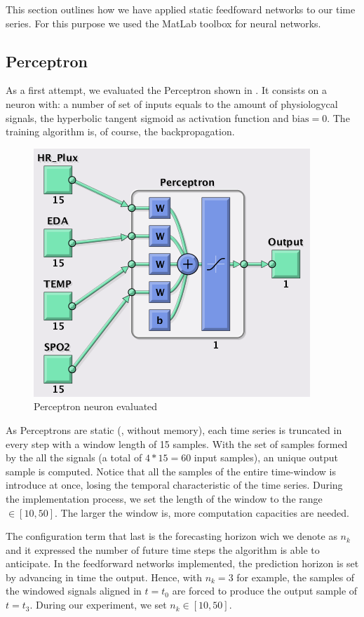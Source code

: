 \label{sec:application:feedforward}

This section outlines how we have applied static feedfoward networks to our time series. For this purpose we used the MatLab toolbox for neural networks.

\subsection{Perceptron}
\label{subsec:perceptronapplication}

As a first attempt, we evaluated the Perceptron shown in . 
It consists on a neuron with:
a number of set of inputs equals to the amount of physiologycal signals,
the hyperbolic tangent sigmoid as activation function
and $\text{bias}=0$. The training algorithm is, of course, the backpropagation.
\begin{figure}[!ht]
\centering
\includegraphics[width=0.5\columnwidth]{images/results/perceptronnn}
\caption{Perceptron neuron evaluated}
\label{fig:perceptronbuildt}
\end{figure}

As Perceptrons are static (\ie, without memory), each time series is truncated in every step with a window length of 15 samples. 
With the set of samples formed by the all the signals (a total of $4*15=60$ input samples), an unique output sample is computed. Notice that all the samples of the entire time-window is introduce at once, losing the temporal characteristic of the time series. During the implementation process, we set the length of the window to the range $\in [10,50]$. The larger the window is, more computation capacities are needed.

The configuration term that last is the forecasting horizon wich we denote as $n_{k}$ and it expressed the number of future time steps the algorithm is able to anticipate.
In the feedforward networks implemented, the prediction horizon is set by advancing in time the output. 
Hence, with $n_{k}=3$ for example, the samples of the windowed signals aligned in $t=t_{0}$ are forced to produce the output sample of $t=t_{3}$.
During our experiment, we set $n_{k}\in [10,50]$. 

